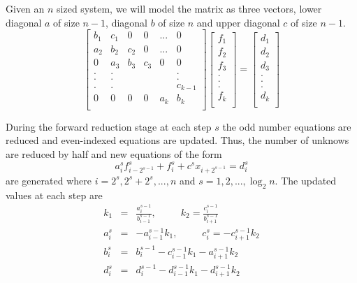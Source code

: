 \documentclass[12pt, oneside]{book}
\theoremstyle{plain}
\theoremstyle{definition}
\begin{document}
Given an $n$ sized system, we will model the matrix as three vectors, lower diagonal $a$ of size $n - 1$, diagonal $b$ of size $n$ and upper diagonal $c$ of size $n - 1$. 
$$
\begin{bmatrix}  
b_1 & c_1 & 0 & 0 & ... & 0 \\ 
a_2 & b_2 & c_2 & 0 & ... & 0 \\ 
0 & a_3 & b_3 & c_3 & 0 & 0 \\ 
. & . &  &  &  & . \\ 
. & . &  &  &  & . \\ 
. & . &  &  &  & c_{k-1} \\ 
0 & 0 & 0 & 0 & a_k & b_k \\ 
\end{bmatrix} \begin{bmatrix}  
f_1 \\ 
f_2 \\ 
f_3 \\ 
.\\ 
.\\ 
.\\ 
f_k \\ 
\end{bmatrix} = \begin{bmatrix} 
d_1 \\ 
d_2 \\ 
d_3 \\ 
.\\ 
.\\ 
.\\ 
d_k \\ 
\end{bmatrix}
$$


During the forward reduction stage  at each step $s$ the odd number equations are reduced and even-indexed equations are updated. Thus, the number of unknows are reduced by half and new equations of the form
\begin{equation}
a_i^{s} f_{i - 2^{s - 1}}^{s} + f_i^{s} + c^{s}  x_{i + 2^{s - 1}} = d_i^s
\end{equation}
are generated where $ i = 2^s, 2^s + 2^s, ... , n$ and $s = 1, 2, ... , \log_2 n$. The updated values at each step are  
\begin{eqnarray}
k_1 &=& \frac{ a_{i}^{s - 1}}{b_{i-1}^{s - 1}}, \hspace{30pt} k_2 = \frac{ c_{i}^{s - 1}}{b_{i+1}^{s - 1}} \\
a_i^{s} &=& -a_{i-1}^{s - 1}  k_1, \hspace{30pt} c_i^{s} = -c_{i+1}^{s - 1}  k_2\\
b_i^{s} &=& b_{i}^{s - 1} -c_{i-1}^{s - 1} k_1 - a_{i+1}^{s - 1}  k_2  \\
d_i^{s} &=& d_i^{s - 1} - d_{i- 1}^{s - 1}  k_1 - d_{i + 1}^{s - 1}   k_2
\end{eqnarray}
\end{document}
